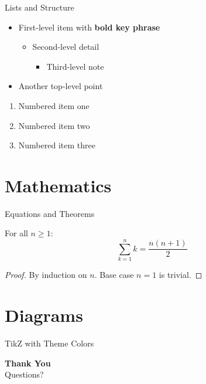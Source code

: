 \documentclass[aspectratio=169,10pt]{beamer}
\begin{document}
\begin{frame}{Lists and Structure}
  \begin{itemize}
    \item First-level item with \textbf{bold key phrase}
    \begin{itemize}
      \item Second-level detail
      \begin{itemize}
        \item Third-level note
      \end{itemize}
    \end{itemize}
    \item Another top-level point
  \end{itemize}

  \vskip12pt

  \begin{enumerate}
    \item Numbered item one
    \item Numbered item two
    \item Numbered item three
  \end{enumerate}
\end{frame}

\section{Mathematics}

\begin{frame}{Equations and Theorems}
  \begin{theorem}[Sample]
    For all $n \geq 1$:
    \[
      \sum_{k=1}^{n} k = \frac{n(n+1)}{2}
    \]
  \end{theorem}

  \begin{proof}
    By induction on $n$. Base case $n=1$ is trivial.
  \end{proof}
\end{frame}

\section{Diagrams}

\begin{frame}{TikZ with Theme Colors}
  \centering
\end{frame}

\begin{frame}
  \vfill
  \begin{center}
    {\Large\bfseries{} Thank You}\\[8pt]
    { Questions?}
  \end{center}
  \vfill
\end{frame}
\end{document}
